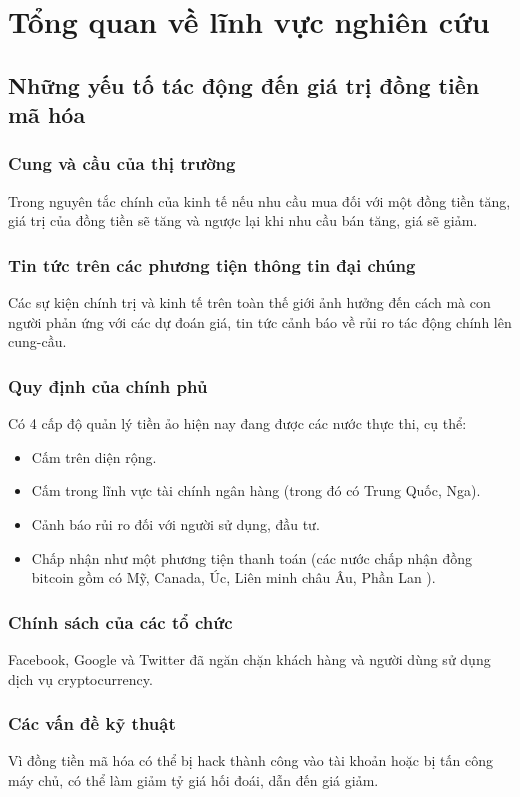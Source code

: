 \chapter{Tổng quan về lĩnh vực nghiên cứu} \label{chap-Overview}
\section{Những yếu tố tác động đến giá trị đồng tiền mã hóa} \label{overview:factor}
\subsection{Cung và cầu của thị trường}
Trong nguyên tắc chính của kinh tế nếu nhu cầu mua đối với một đồng tiền tăng, giá trị của đồng tiền sẽ tăng và ngược lại khi nhu cầu bán tăng, giá sẽ giảm.
\subsection{Tin tức trên các phương tiện thông tin đại chúng}
Các sự kiện chính trị và kinh tế trên toàn thế giới ảnh hưởng đến cách mà con người phản ứng với các dự đoán giá, tin tức cảnh báo về rủi ro tác động chính lên cung-cầu.
\subsection{Quy định của chính phủ}
Có 4 cấp độ quản lý tiền ảo hiện nay đang được các nước thực thi, cụ thể:
\begin{itemize}
\item Cấm trên diện rộng.
\item Cấm trong lĩnh vực tài chính ngân hàng (trong đó có Trung Quốc, Nga).
\item Cảnh báo rủi ro đối với người sử dụng, đầu tư.
\item  Chấp nhận như một phương tiện thanh toán (các nước chấp nhận đồng bitcoin gồm có Mỹ, Canada, Úc, Liên minh châu Âu, Phần Lan \cite{CountriesAllowBTC} ).
\end{itemize}
\subsection{Chính sách của các tổ chức}
Facebook, Google và Twitter đã ngăn chặn khách hàng và người dùng sử dụng dịch vụ cryptocurrency.
\subsection{Các vấn đề kỹ thuật}
Vì đồng tiền mã hóa có thể bị hack thành công vào tài khoản hoặc bị tấn công máy chủ, có thể làm giảm tỷ giá hối đoái, dẫn đến giá giảm.
